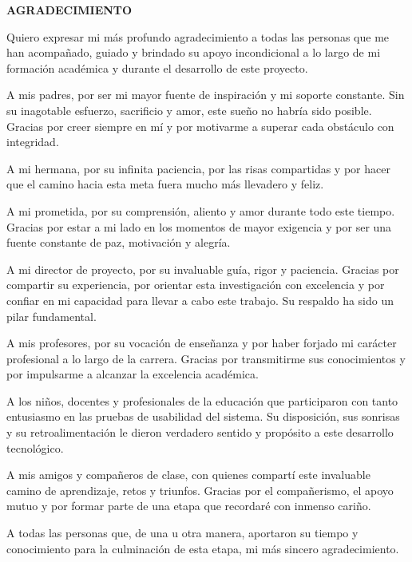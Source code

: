 \begin{center}
    \vspace*{0.5cm}
    {\bfseries AGRADECIMIENTO}
\end{center}
\vspace{0.8cm}

\justifying
\noindent
Quiero expresar mi más profundo agradecimiento a todas las personas que me han acompañado, guiado y brindado su apoyo incondicional a lo largo de mi formación académica y durante el desarrollo de este proyecto.

A mis padres, por ser mi mayor fuente de inspiración y mi soporte constante. Sin su inagotable esfuerzo, sacrificio y amor, este sueño no habría sido posible. Gracias por creer siempre en mí y por motivarme a superar cada obstáculo con integridad.

A mi hermana, por su infinita paciencia, por las risas compartidas y por hacer que el camino hacia esta meta fuera mucho más llevadero y feliz.

A mi prometida, por su comprensión, aliento y amor durante todo este tiempo. Gracias por estar a mi lado en los momentos de mayor exigencia y por ser una fuente constante de paz, motivación y alegría.

A mi director de proyecto, por su invaluable guía, rigor y paciencia. Gracias por compartir su experiencia, por orientar esta investigación con excelencia y por confiar en mi capacidad para llevar a cabo este trabajo. Su respaldo ha sido un pilar fundamental.

A mis profesores, por su vocación de enseñanza y por haber forjado mi carácter profesional a lo largo de la carrera. Gracias por transmitirme sus conocimientos y por impulsarme a alcanzar la excelencia académica.

A los niños, docentes y profesionales de la educación que participaron con tanto entusiasmo en las pruebas de usabilidad del sistema. Su disposición, sus sonrisas y su retroalimentación le dieron verdadero sentido y propósito a este desarrollo tecnológico.

A mis amigos y compañeros de clase, con quienes compartí este invaluable camino de aprendizaje, retos y triunfos. Gracias por el compañerismo, el apoyo mutuo y por formar parte de una etapa que recordaré con inmenso cariño.

A todas las personas que, de una u otra manera, aportaron su tiempo y conocimiento para la culminación de esta etapa, mi más sincero agradecimiento.

\newpage
